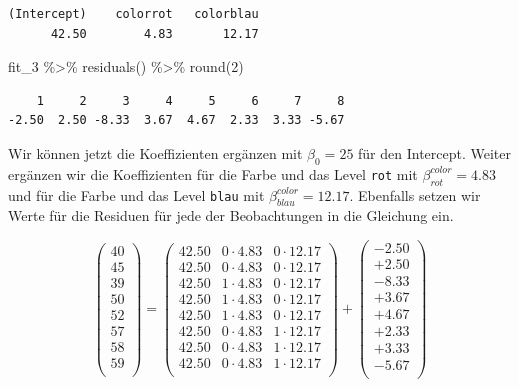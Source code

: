 \documentclass[
  letterpaper,
]{scrbook}
\newenvironment{Shaded}{\begin{snugshade}}{\end{snugshade}}
\newcommand{\DecValTok}[1]{\textcolor[rgb]{0.68,0.00,0.00}{#1}}
\newcommand{\FunctionTok}[1]{\textcolor[rgb]{0.28,0.35,0.67}{#1}}
\newcommand{\NormalTok}[1]{\textcolor[rgb]{0.00,0.23,0.31}{#1}}
\newcommand{\SpecialCharTok}[1]{\textcolor[rgb]{0.37,0.37,0.37}{#1}}
\begin{document}
\begin{verbatim}
(Intercept)    colorrot   colorblau 
      42.50        4.83       12.17 
\end{verbatim}

\begin{Shaded}
\begin{Highlighting}[]
\NormalTok{fit\_3 }\SpecialCharTok{\%\textgreater{}\%} \FunctionTok{residuals}\NormalTok{() }\SpecialCharTok{\%\textgreater{}\%} \FunctionTok{round}\NormalTok{(}\DecValTok{2}\NormalTok{)}
\end{Highlighting}
\end{Shaded}

\begin{verbatim}
    1     2     3     4     5     6     7     8 
-2.50  2.50 -8.33  3.67  4.67  2.33  3.33 -5.67 
\end{verbatim}

Wir können jetzt die Koeffizienten ergänzen mit \(\beta_0 = 25\) für den
Intercept. Weiter ergänzen wir die Koeffizienten für die Farbe und das
Level \texttt{rot} mit \(\beta^{color}_{rot} = 4.83\) und für die Farbe
und das Level \texttt{blau} mit \(\beta^{color}_{blau} = 12.17\).
Ebenfalls setzen wir Werte für die Residuen für jede der Beobachtungen
in die Gleichung ein.

\[
 \begin{pmatrix}
  40 \\
  45 \\
  39 \\
  50 \\
  52 \\
  57 \\
  58 \\
  59 \\
 \end{pmatrix}
 =
  \begin{pmatrix}
  42.50 & 0 \cdot 4.83& 0 \cdot 12.17 \\
  42.50 & 0 \cdot 4.83& 0 \cdot 12.17\\
  42.50 & 1 \cdot 4.83& 0 \cdot 12.17\\
  42.50 & 1 \cdot 4.83& 0 \cdot 12.17\\
  42.50 & 1 \cdot 4.83& 0 \cdot 12.17\\
  42.50 & 0 \cdot 4.83& 1 \cdot 12.17\\
  42.50 & 0 \cdot 4.83& 1 \cdot 12.17\\
  42.50 & 0 \cdot 4.83& 1 \cdot 12.17\\
 \end{pmatrix} +
  \begin{pmatrix}
  -2.50 \\
  +2.50 \\
  -8.33 \\
  +3.67 \\
  +4.67 \\
  +2.33 \\
  +3.33 \\
  -5.67 \\
 \end{pmatrix}
\]
\end{document}
